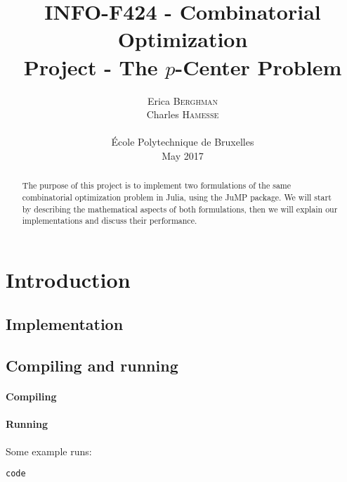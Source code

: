 \documentclass[a4paper,10pt]{article}
\title{INFO-F424 - Combinatorial Optimization\\Project - The $p$-Center Problem}
\date{\vspace{-3ex}
Erica \textsc{Berghman} \\
Charles \textsc{Hamesse} \\
~\\
École Polytechnique de Bruxelles\\
\vspace{6ex}May 2017\vspace{4ex}}
\begin{document}

\maketitle
\begin{abstract}
    The purpose of this project is to implement two formulations of the same combinatorial optimization problem in Julia, using the JuMP package. We will start by describing the mathematical aspects of both formulations, then we will explain our implementations and discuss their performance.\vspace{2ex}
\end{abstract}

\tableofcontents
\pagebreak



\section{Introduction}

\subsection{Implementation}

\subsection{Compiling and running}
 
\paragraph{Compiling}

\paragraph{Running}
Some example runs:
\begin{lstlisting}
code
\end{lstlisting}
\end{document}
